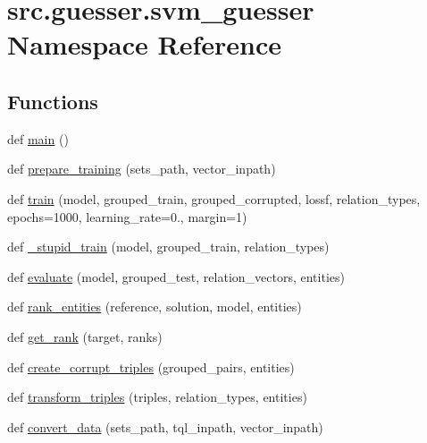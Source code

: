 \hypertarget{namespacesrc_1_1guesser_1_1svm__guesser}{}\section{src.\+guesser.\+svm\+\_\+guesser Namespace Reference}
\label{namespacesrc_1_1guesser_1_1svm__guesser}
\subsection*{Functions}
\begin{DoxyCompactItemize}
\item 
def \hyperlink{namespacesrc_1_1guesser_1_1svm__guesser_af0a15ec0f6bea29bc99fcce23bd3ebb0}{main} ()
\item 
def \hyperlink{namespacesrc_1_1guesser_1_1svm__guesser_a8c54c05a7a892e16fc90f7453498a04d}{prepare\+\_\+training} (sets\+\_\+path, vector\+\_\+inpath)
\item 
def \hyperlink{namespacesrc_1_1guesser_1_1svm__guesser_a864007265fbd9dcc2dbc2437499ff3f6}{train} (model, grouped\+\_\+train, grouped\+\_\+corrupted, lossf, relation\+\_\+types, epochs=1000, learning\+\_\+rate=0., margin=1)
\item 
def \hyperlink{namespacesrc_1_1guesser_1_1svm__guesser_ad86de62133a12499bf18fa8910bba858}{\+\_\+stupid\+\_\+train} (model, grouped\+\_\+train, relation\+\_\+types)
\item 
def \hyperlink{namespacesrc_1_1guesser_1_1svm__guesser_ad415894d44f4d9a422c31fb45f34ec89}{evaluate} (model, grouped\+\_\+test, relation\+\_\+vectors, entities)
\item 
def \hyperlink{namespacesrc_1_1guesser_1_1svm__guesser_a9b3dc374f8fe43fa22ab034de3c01cf4}{rank\+\_\+entities} (reference, solution, model, entities)
\item 
def \hyperlink{namespacesrc_1_1guesser_1_1svm__guesser_a5bdc93643767e3cb2eb120cf09983702}{get\+\_\+rank} (target, ranks)
\item 
def \hyperlink{namespacesrc_1_1guesser_1_1svm__guesser_a46c3bf2fd1c519e3014007828c33c64d}{create\+\_\+corrupt\+\_\+triples} (grouped\+\_\+pairs, entities)
\item 
def \hyperlink{namespacesrc_1_1guesser_1_1svm__guesser_a90e7986eb6b2f54ff825144cc31d5072}{transform\+\_\+triples} (triples, relation\+\_\+types, entities)
\item 
def \hyperlink{namespacesrc_1_1guesser_1_1svm__guesser_ab129201b9264ddfb4e334b40366aa4e6}{convert\+\_\+data} (sets\+\_\+path, tql\+\_\+inpath, vector\+\_\+inpath)

\end{DoxyCompactItemize}
